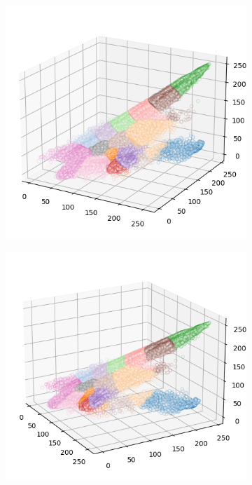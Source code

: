 \begin{figure}[htbp]
\begin{subfigure}[t]{0.32\textwidth}
    \end{subfigure}
    \begin{subfigure}[t]{0.32\textwidth}
        \includegraphics[width=\linewidth]{../../python_code/plots/kmeans/cat-110/clusters_elev20_azim-60.png}
    \end{subfigure}
    \begin{subfigure}[t]{0.32\textwidth}
        \includegraphics[width=\linewidth]{../../python_code/plots/kmeans/cat-110/clusters_elev20_azim-30.png}

\end{subfigure}
\end{figure}
